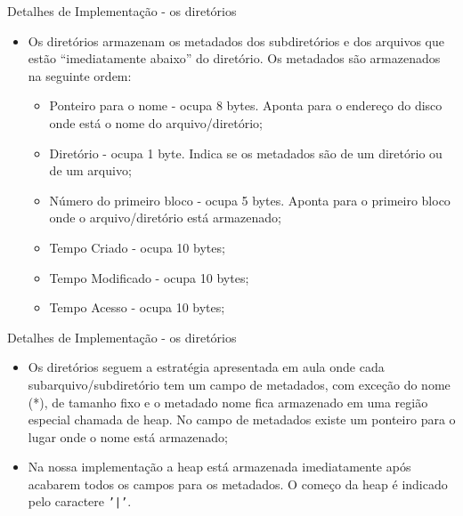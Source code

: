 \documentclass[10pt]{beamer}
\begin{document}
    \begin{frame}{Detalhes de Implementação - os diretórios}
        \begin{itemize}
            \justifying
            \item Os diretórios armazenam os metadados dos subdiretórios e dos arquivos que estão ``imediatamente abaixo'' do diretório. Os metadados são armazenados na seguinte ordem:
            \begin{itemize}
                \justifying
                \item Ponteiro para o nome - ocupa 8 bytes. Aponta para o endereço do disco onde está o nome do arquivo/diretório;
                \item Diretório - ocupa 1 byte. Indica se os metadados são de um diretório ou de um arquivo;
                \item Número do primeiro bloco - ocupa 5 bytes. Aponta para o primeiro bloco onde o arquivo/diretório está armazenado; 
                \item Tempo Criado - ocupa 10 bytes;
                \item Tempo Modificado - ocupa 10 bytes;
                \item Tempo Acesso - ocupa 10 bytes;                
            \end{itemize}
        \end{itemize}
        
    \end{frame}
    \begin{frame}{Detalhes de Implementação - os diretórios}
        \begin{itemize}
            \justifying
            \begin{itemize}
                \justifying
                \item Tamanho - ocupa 8 bytes. Se os metadados são de um diretório, então esse valor é sempre 0;
                \item Nome* - ocupa x bytes. Ao fim do nome estará o caractere \texttt{'|'}.
            \end{itemize}
            \item Os diretórios seguem a estratégia apresentada em aula onde cada subarquivo/subdiretório tem um campo de metadados, com exceção do nome (*), de tamanho fixo e o metadado nome fica armazenado em uma região especial chamada de heap. No campo de metadados existe um ponteiro para o lugar onde o nome está armazenado;
            \item Na nossa implementação a heap está armazenada imediatamente após acabarem todos os campos para os metadados. O começo da heap é indicado pelo caractere \texttt{'|'}.
        \end{itemize}
    \end{frame}
\end{document}
